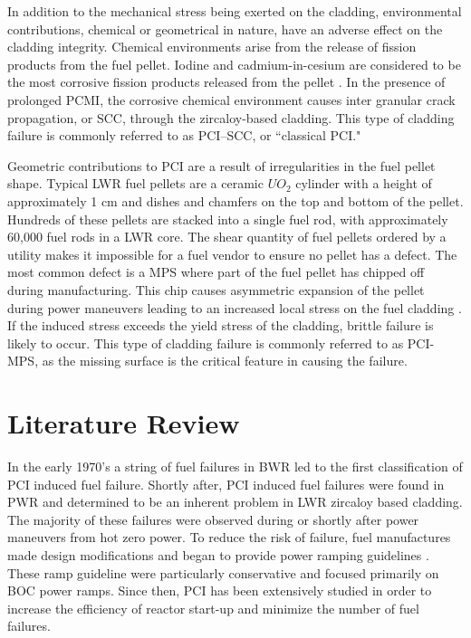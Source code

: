 \documentclass[edeposit,fullpage,11pt]{uiucthesis2009}
\begin{document}
In addition to the mechanical stress being exerted on the cladding, environmental contributions, chemical or geometrical in nature, have an adverse effect on the cladding integrity.
Chemical environments arise from the release of fission products from the fuel pellet.
Iodine and cadmium-in-cesium are considered to be the most corrosive fission products released from the pellet \cite{capps_evaluation_2016}. 
In the presence of prolonged \gls{PCMI}, the corrosive chemical environment causes inter granular crack propagation, or \gls{SCC}, through the zircaloy-based cladding.
This type of cladding failure is commonly referred to as \gls{PCI}--\gls{SCC}, or ``classical \gls{PCI}."

Geometric contributions to \gls{PCI} are a result of irregularities in the fuel pellet shape.
Typical \gls{LWR} fuel pellets are a ceramic $UO_2$ cylinder with a height of approximately 1 cm and dishes and chamfers on the top and bottom of the pellet.
Hundreds of these pellets are stacked into a single fuel rod, with approximately 60,000 fuel rods in a \gls{LWR} core.
The shear quantity of fuel pellets ordered by a utility makes it impossible for a fuel vendor to ensure no pellet has a defect.
The most common defect is a \gls{MPS} where part of the fuel pellet has chipped off during manufacturing.
This chip causes asymmetric expansion of the pellet during power maneuvers leading to an increased local stress on the fuel cladding \cite{capps_evaluation_2016}. 
If the induced stress exceeds the yield stress of the cladding, brittle failure is likely to occur.
This type of cladding failure is commonly referred to as \gls{PCI}-\gls{MPS}, as the missing surface is the critical feature in causing the failure.


\section{Literature Review}

In the early 1970's a string of fuel failures in \gls{BWR} led to the first classification of \gls{PCI} induced fuel failure.  
Shortly after, \gls{PCI} induced fuel failures were found in \gls{PWR} and determined to be an inherent problem in \gls{LWR} zircaloy based cladding. 
The majority of these failures were observed during or shortly after power maneuvers from hot zero power.
To reduce the risk of failure, fuel manufactures made design modifications and began to provide power ramping guidelines \cite{kennard_pci_2016}.
These ramp guideline were particularly conservative and focused primarily on \gls{BOC} power ramps. 
Since then, \gls{PCI} has been extensively studied in order to increase the efficiency of reactor start-up and minimize the number of fuel failures.
 
\end{document}
